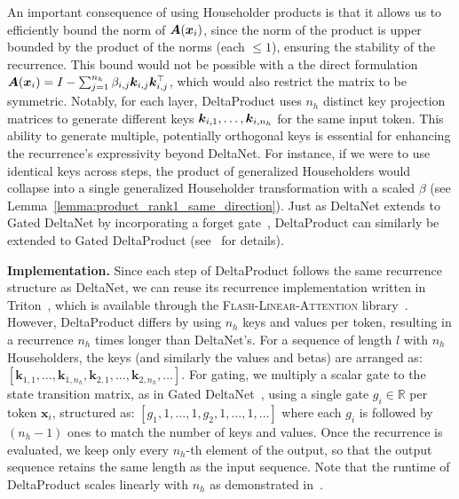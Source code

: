 \documentclass{article} %
\begin{document}
An important consequence of using Householder products is that it allows us to efficiently bound the norm of ${\bm{A}}({\bm{x}}_i)$, since the norm of the product is upper bounded by the product of the norms (each $\leq 1$), ensuring the stability of the recurrence. %
This bound would not be possible with a  the direct formulation ${\bm{A}}({\bm{x}}_i) = I - \sum_{j=1}^{n_h} \beta_{i,j}{\bm{k}}_{i,j}{\bm{k}}_{i,j}^\top$, which would also restrict the matrix to be symmetric.
Notably, for each layer, DeltaProduct uses $n_h$ distinct key projection matrices to generate different keys ${\bm{k}}_{i,1},\dots, {\bm{k}}_{i,n_h}$ for the same input token. This ability to generate multiple, potentially orthogonal keys is essential for enhancing the recurrence's expressivity beyond DeltaNet. For instance, if we were to use identical keys across steps, the product of generalized Householders would collapse into a single generalized Householder transformation with a scaled $\beta$ (see Lemma~\ref{lemma:product_rank1_same_direction}). Just as DeltaNet extends to Gated DeltaNet by incorporating a forget gate~\citep{yang-iclr25a}, DeltaProduct can similarly be extended to Gated DeltaProduct (see~ for details).


\textbf{Implementation.}  
Since each step of DeltaProduct follows the same recurrence structure as DeltaNet, we can reuse its recurrence implementation written in Triton~\citep{tillet2019triton}, which is available through the \textsc{Flash-Linear-Attention} library~\citep{yang2024fla}. However, DeltaProduct differs by using $n_h$ keys and values per token, resulting in a recurrence $n_h$ times longer than DeltaNet's. For a sequence of length \( l \) with \( n_h \) Householders, the keys (and similarly the values and betas) are arranged as:  
$
\left[\mathbf{k}_{1,1}, \ldots, \mathbf{k}_{1,n_h}, \mathbf{k}_{2,1}, \ldots, \mathbf{k}_{2,n_h}, \ldots \right].
$
For gating, we multiply a scalar gate to the state transition matrix, as in Gated DeltaNet~\citep{yang-iclr25a}, using a single gate \( g_i \in \mathbb{R}\) per token \( \mathbf{x}_i \), structured as:  
$
\left[ g_1, 1, \ldots, 1, g_2, 1, \ldots, 1, \ldots \right]
$ 
where each \( g_i \) is followed by \( (n_h-1) \) ones to match the number of keys and values. Once the recurrence is evaluated, we keep only every $n_h$-th element of the output,
so that the output sequence retains the same length as the input sequence. Note that the runtime of DeltaProduct scales linearly with $n_h$ as demonstrated in~.
\end{document}
